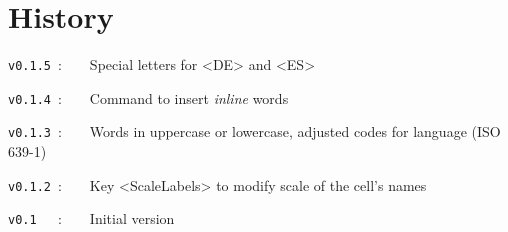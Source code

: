 \documentclass{article}
\begin{document}
\begin{PresentationCode}{}
{\Huge {}}

{\Huge {}}
\end{PresentationCode}

\newpage

\part*{History}

\verb|v0.1.5|~:~~~~Special letters for \textsf{<DE>} and \textsf{<ES>}

\verb|v0.1.4|~:~~~~Command to insert \textit{inline} words

\verb|v0.1.3|~:~~~~Words in uppercase or lowercase, adjusted codes for language (ISO 639-1)

\verb|v0.1.2|~:~~~~Key \textsf{<ScaleLabels>} to modify scale of the cell's names

\verb|v0.1  |~:~~~~Initial version
\end{document}
